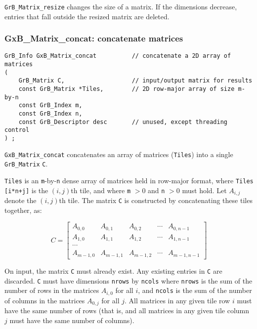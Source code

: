 \documentclass[12pt]{article}
\begin{document}
\verb'GrB_Matrix_resize' changes the size of a matrix.
If the dimensions decrease, entries that fall outside the resized
matrix are deleted.

\subsubsection{{\sf GxB\_Matrix\_concat:} concatenate matrices   }
\label{matrix_concat}

\begin{mdframed}[userdefinedwidth=6in]
{\footnotesize
\begin{verbatim}
GrB_Info GxB_Matrix_concat          // concatenate a 2D array of matrices
(
    GrB_Matrix C,                   // input/output matrix for results
    const GrB_Matrix *Tiles,        // 2D row-major array of size m-by-n
    const GrB_Index m,
    const GrB_Index n,
    const GrB_Descriptor desc       // unused, except threading control
) ;
\end{verbatim} } \end{mdframed}

\verb'GxB_Matrix_concat' concatenates an array of matrices (\verb'Tiles') into
a single \verb'GrB_Matrix' \verb'C'.

\verb'Tiles' is an \verb'm'-by-\verb'n' dense array of matrices held in
row-major format, where \verb'Tiles [i*n+j]' is the $(i,j)$th tile, and where
\verb'm' $> 0$ and \verb'n' $> 0$ must hold.  Let $A_{i,j}$ denote the
$(i,j)$th tile.  The matrix \verb'C' is constructed by concatenating these
tiles together, as:

\[
C = 
\left[
\begin{array}{ccccc}
          A_{0,0}   & A_{0,1}   & A_{0,2}   & \cdots & A_{0,n-1}   \\
          A_{1,0}   & A_{1,1}   & A_{1,2}   & \cdots & A_{1,n-1}   \\
          \cdots    &                                              \\
          A_{m-1,0} & A_{m-1,1} & A_{m-1,2} & \cdots & A_{m-1,n-1}
\end{array}
\right]
\]

On input, the matrix \verb'C' must already exist.  Any existing entries in
\verb'C' are discarded.  \verb'C' must have dimensions \verb'nrows' by
\verb'ncols' where \verb'nrows' is the sum of the number of rows in the
matrices $A_{i,0}$ for all $i$, and \verb'ncols' is the sum of the number of
columns in the matrices $A_{0,j}$ for all $j$.  All matrices in any given tile
row $i$ must have the same number of rows (that is, and all matrices in any
given tile column $j$ must have the same number of columns).
\end{document}
